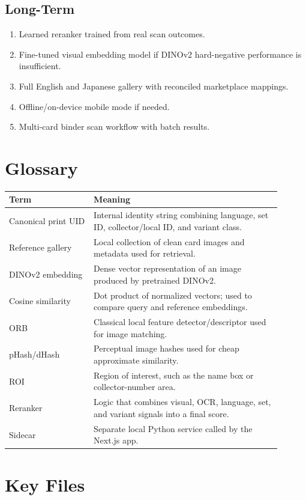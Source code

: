 \documentclass[11pt,a4paper]{article}
\begin{document}
\subsection{Long-Term}

\begin{enumerate}
  \item Learned reranker trained from real scan outcomes.
  \item Fine-tuned visual embedding model if DINOv2 hard-negative performance is insufficient.
  \item Full English and Japanese gallery with reconciled marketplace mappings.
  \item Offline/on-device mobile mode if needed.
  \item Multi-card binder scan workflow with batch results.
\end{enumerate}

\section{Glossary}

\begin{longtable}{p{0.28\linewidth} p{0.62\linewidth}}
\toprule
Term & Meaning \\
\midrule
Canonical print UID & Internal identity string combining language, set ID, collector/local ID, and variant class. \\
Reference gallery & Local collection of clean card images and metadata used for retrieval. \\
DINOv2 embedding & Dense vector representation of an image produced by pretrained DINOv2. \\
Cosine similarity & Dot product of normalized vectors; used to compare query and reference embeddings. \\
ORB & Classical local feature detector/descriptor used for image matching. \\
pHash/dHash & Perceptual image hashes used for cheap approximate similarity. \\
ROI & Region of interest, such as the name box or collector-number area. \\
Reranker & Logic that combines visual, OCR, language, set, and variant signals into a final score. \\
Sidecar & Separate local Python service called by the Next.js app. \\
\bottomrule
\end{longtable}

\section{Key Files}
\end{document}
